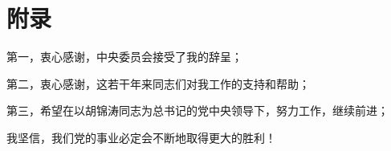 \titleformat{\chapter}{\centering\xiaosan\hei}{\chaptername}{2em}{} %



\chapter*{附\quad 录}

第一，衷心感谢，中央委员会接受了我的辞呈；

第二，衷心感谢，这若干年来同志们对我工作的支持和帮助；

第三，希望在以胡锦涛同志为总书记的党中央领导下，努力工作，继续前进；

我坚信，我们党的事业必定会不断地取得更大的胜利！

\clearpage
